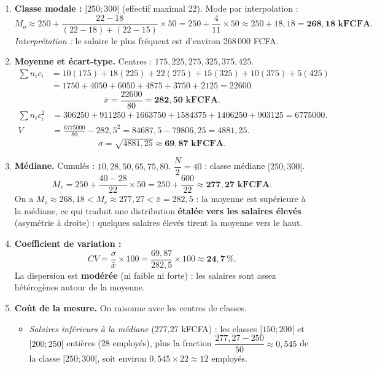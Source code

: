 \documentclass[11pt]{article}
\begin{document}
\begin{corrige}
\begin{enumerate}
    \item \textbf{Classe modale :} $[250;300[$ (effectif maximal 22). Mode par interpolation :
    \[ M_o \approx 250 + \frac{22-18}{(22-18)+(22-15)}\times 50 = 250 + \frac{4}{11}\times 50 \approx 250 + 18{,}18 = \mathbf{268{,}18 \text{ kFCFA}}. \]
    \emph{Interprétation :} le salaire le plus fréquent est d'environ 268\,000 FCFA.
    \item \textbf{Moyenne et écart-type.} Centres : $175, 225, 275, 325, 375, 425$.
    \begin{align*}
    \sum n_i c_i &= 10(175)+18(225)+22(275)+15(325)+10(375)+5(425)\\
    &= 1750+4050+6050+4875+3750+2125 = 22600.
    \end{align*}
    \[ \bar{x} = \frac{22600}{80} = \mathbf{282{,}50 \text{ kFCFA}}. \]
    \begin{align*}
    \sum n_i c_i^2 &= 306250+911250+1663750+1584375+1406250+903125 = 6775000.\\
    V &= \frac{6775000}{80} - 282{,}5^2 = 84687{,}5 - 79806{,}25 = 4881{,}25.
    \end{align*}
    \[ \sigma = \sqrt{4881{,}25} \approx \mathbf{69{,}87 \text{ kFCFA}}. \]
    \item \textbf{Médiane.} Cumulés : $10, 28, 50, 65, 75, 80$. $\dfrac{N}{2} = 40$ : classe médiane $[250;300[$.
    \[ M_e = 250 + \frac{40-28}{22}\times 50 = 250 + \frac{600}{22} \approx \mathbf{277{,}27 \text{ kFCFA}}. \]
    On a $M_o \approx 268{,}18 < M_e \approx 277{,}27 < \bar{x} = 282{,}5$ : la moyenne est supérieure à la médiane, ce qui traduit une distribution \textbf{étalée vers les salaires élevés} (asymétrie à droite) : quelques salaires élevés tirent la moyenne vers le haut.
    \item \textbf{Coefficient de variation :}
    \[ CV = \frac{\sigma}{\bar{x}}\times 100 = \frac{69{,}87}{282{,}5}\times 100 \approx \mathbf{24{,}7\,\%}. \]
    La dispersion est \textbf{modérée} (ni faible ni forte) : les salaires sont assez hétérogènes autour de la moyenne.
    \item \textbf{Coût de la mesure.} On raisonne avec les centres de classes.
    \begin{itemize}
        \item \emph{Salaires inférieurs à la médiane} (277,27 kFCFA) : les classes $[150;200[$ et $[200;250[$ entières (28 employés), plus la fraction $\dfrac{277{,}27-250}{50} \approx 0{,}545$ de la classe $[250;300[$, soit environ $0{,}545 \times 22 \approx 12$ employés.

\end{itemize}
\end{enumerate}
\end{corrige}
\end{document}
